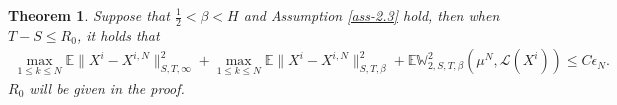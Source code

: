 \documentclass[12pt]{article}
\newtheorem{theorem}{Theorem}[section]
\def\L{\mathscr{L}}
\def\N{\mathbb N}
\def\E{\mathbb E}
\def\W{\mathbb{W}}
\numberwithin{equation}{section}
\begin{document}
	\begin{theorem}\label{thm-3.4}
		Suppose that $\frac{1}{2}<\beta<H$ and Assumption \ref{ass-2.3} hold, then when $T-S\leq R_0$, it holds that
		\begin{equation}
			\begin{aligned}
			\max_{1\leq k \leq N}{\E\|X^i-X^{i,N}\|^2_{S,T,\infty}}+\max_{1\leq k \leq N}{\E\|X^i-X^{i,N}\|^2_{S,T,\beta}}+\E\W^2_{2,S,T,\beta}(\mu^N,\L(X^i))\leq C\epsilon_N.
			\end{aligned}
		\end{equation}
	   $R_0$ will be given in the proof.
	\end{theorem}
\end{document}
